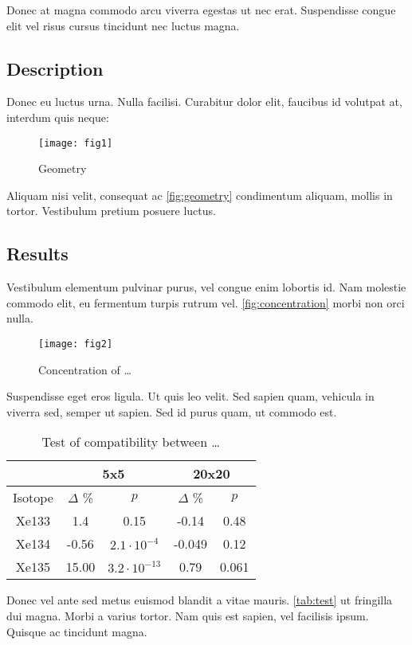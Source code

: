 \documentclass{snamc2013}
\begin{document}
Donec at magna commodo arcu viverra egestas ut nec erat. Suspendisse congue elit
vel risus cursus tincidunt nec luctus magna.

\subsection{Description}

Donec eu luctus urna. Nulla facilisi. Curabitur dolor elit, faucibus id volutpat
at, interdum quis neque:
\begin{figure}[htb]
  \centering
  \texttt{[image: fig1]}
  \caption{Geometry}
  \label{fig:geometry}
\end{figure}
Aliquam nisi velit, consequat ac \autoref{fig:geometry} condimentum aliquam,
mollis in tortor. Vestibulum pretium posuere luctus.

\subsection{Results}

Vestibulum elementum pulvinar purus, vel congue enim lobortis id. Nam molestie
commodo elit, eu fermentum turpis rutrum vel. \autoref{fig:concentration} morbi
non orci nulla.
\begin{figure}[htb]
  \centering
  \texttt{[image: fig2]}
  \caption{Concentration of \dots}
  \label{fig:concentration}
\end{figure}
Suspendisse eget eros ligula. Ut quis leo velit. Sed sapien quam, vehicula in
viverra sed, semper ut sapien. Sed id purus quam, ut commodo est.
\begin{table}[htb]
  \footnotesize
  \centering
  \begin{tabular}{*5c}
    \toprule
    & \multicolumn{2}{c}{5x5} & \multicolumn{2}{c}{20x20} \\
    \midrule
    Isotope & $\Delta$ \% & $p$ & $\Delta$ \% & $p$ \\
    \midrule
    Xe133 & 1.4 & 0.15 & -0.14 & 0.48 \\
    Xe134 & -0.56 & $2.1\cdot10^{-4}$ & -0.049 & 0.12 \\
    Xe135 & 15.00 & $3.2\cdot10^{-13}$ & 0.79 & 0.061 \\
    \bottomrule
  \end{tabular}
  \caption{Test of compatibility between \dots}
  \label{tab:test}
\end{table}
Donec vel ante sed metus euismod blandit a vitae mauris. \autoref{tab:test} ut
fringilla dui magna. Morbi a varius tortor. Nam quis est sapien, vel facilisis
ipsum. Quisque ac tincidunt magna.
\end{document}
